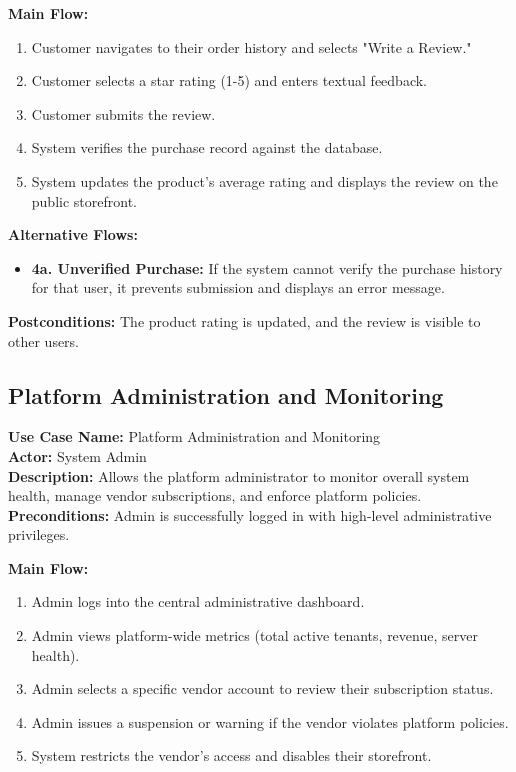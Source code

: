 \vspace{0.2cm}
\textbf{Main Flow:}
\begin{enumerate}
    \item Customer navigates to their order history and selects "Write a Review."
    \item Customer selects a star rating (1-5) and enters textual feedback.
    \item Customer submits the review.
    \item System verifies the purchase record against the database.
    \item System updates the product's average rating and displays the review on the public storefront.
\end{enumerate}

\textbf{Alternative Flows:}
\begin{itemize}
    \item \textbf{4a. Unverified Purchase:} If the system cannot verify the purchase history for that user, it prevents submission and displays an error message.
\end{itemize}

\vspace{0.2cm}
\textbf{Postconditions:} The product rating is updated, and the review is visible to other users.


\vspace{0.5cm}
\subsection{Platform Administration and Monitoring}
\textbf{Use Case Name:} Platform Administration and Monitoring\\
\textbf{Actor:} System Admin\\
\textbf{Description:} Allows the platform administrator to monitor overall system health, manage vendor subscriptions, and enforce platform policies.\\
\textbf{Preconditions:} Admin is successfully logged in with high-level administrative privileges.

\vspace{0.2cm}
\textbf{Main Flow:}
\begin{enumerate}
    \item Admin logs into the central administrative dashboard.
    \item Admin views platform-wide metrics (total active tenants, revenue, server health).
    \item Admin selects a specific vendor account to review their subscription status.
    \item Admin issues a suspension or warning if the vendor violates platform policies.
    \item System restricts the vendor's access and disables their storefront.
\end{enumerate}

